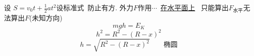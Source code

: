 设 $S=v_0t+\tfrac12at^2$\quad 设标准式\ 防止有方. %
外力$F$作用$\cdots$\ \underline{在水平面上}\ %
只能算出$F_{\text{水平}}$\quad 无法算出$F$(未知方向)
\[ mgh=E_K \]
\[ h^2=R^2-(R-x)^2 \]
\[ h=\sqrt{R^2-(R-x)^2}\qquad\text{椭圆} \]

